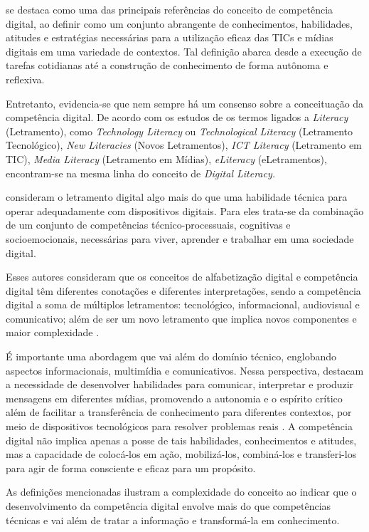 \documentclass[portuguese]{textolivre}
\begin{document}
\textcite{ferrari2012} se destaca como uma das principais referências do
conceito de competência digital, ao definir como um conjunto abrangente
de conhecimentos, habilidades, atitudes e estratégias necessárias para a
utilização eficaz das TICs e mídias digitais em uma variedade de
contextos. Tal definição abarca desde a execução de tarefas cotidianas
até a construção de conhecimento de forma autônoma e reflexiva.

Entretanto, evidencia-se que nem sempre há um consenso sobre a
conceituação da competência digital. De acordo com os estudos de \textcite{silva2019a} os termos ligados a \emph{Literacy }(Letramento), como
\emph{Technology Literacy} ou \emph{Technological Literacy} (Letramento
Tecnológico), \emph{New Literacies} (Novos Letramentos), \emph{ICT
Literacy} (Letramento em TIC), \emph{Media Literacy} (Letramento em
Mídias), \emph{eLiteracy} (eLetramentos), encontram-se na mesma linha do
conceito de \emph{Digital Literacy.}

\textcite{redecker2012} consideram o letramento digital algo
mais do que uma habilidade técnica para operar adequadamente com
dispositivos digitais. Para eles trata-se da combinação de um conjunto
de competências técnico-processuais, cognitivas e socioemocionais,
necessárias para viver, aprender e trabalhar em uma sociedade digital.

Esses autores consideram que os conceitos de alfabetização digital e
competência digital têm diferentes conotações e diferentes
interpretações, sendo a competência digital a soma de múltiplos
letramentos: tecnológico, informacional, audiovisual e comunicativo;
além de ser um novo letramento que implica novos componentes e maior
complexidade \cite{ferrari2012}.

É importante uma abordagem que vai além do domínio técnico, englobando
aspectos informacionais, multimídia e comunicativos. Nessa perspectiva,
\textcite{gewerc2015} destacam a necessidade de desenvolver
habilidades para comunicar, interpretar e produzir mensagens em
diferentes mídias, promovendo a autonomia e o espírito crítico além de
facilitar a transferência de conhecimento para diferentes contextos, por
meio de dispositivos tecnológicos para resolver problemas reais
\cite{gewerc2015}. A competência digital não implica apenas a posse de
tais habilidades, conhecimentos e atitudes, mas a capacidade de
colocá-los em ação, mobilizá-los, combiná-los e transferi-los para agir
de forma consciente e eficaz para um propósito.

As definições mencionadas ilustram a complexidade do conceito ao indicar
que o desenvolvimento da competência digital envolve mais do que
competências técnicas e vai além de tratar a informação e transformá-la
em conhecimento.
\end{document}
